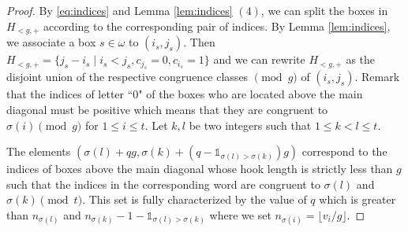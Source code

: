\documentclass[11pt,letterpaper]{amsart}
\numberwithin{equation}{section}
\numberwithin{df}{section}
\begin{document}
\begin{proof}
By \eqref{eq:indices} and Lemma \ref{lem:indices} $(4)$, we can split the boxes in $H_{<g,+}$ according to the corresponding pair of indices. By Lemma \ref{lem:indices}, we associate a box $s\in\omega$ to $(i_s,j_s)$. Then $H_{<g,+}=\lbrace j_s-i_s \mid i_s<j_s, c_{j_s}=0, c_{i_s}=1\rbrace$ and we can rewrite $H_{<g,+}$ as the disjoint union of the respective congruence classes $\pmod{g}$ of $(i_s,j_s)$. Remark that the indices of letter ``$0$" of the boxes who are located above the main diagonal must be positive which means that they are congruent to $\sigma(i)\pmod{g}$ for $1\leq i \leq t$.
Let $k,l$ be two integers such that $1\leq k <l \leq t$.

The elements $(\sigma(l)+qg,\sigma(k)+(q-\mathds{1}_{\sigma(l)>\sigma(k)})g)$ correspond to the indices of boxes above the main diagonal whose hook length is strictly less than $g$ such that the indices in the corresponding word are congruent to $\sigma(l)$ and $\sigma(k)\pmod{t}$. This set is fully characterized by the value of $q$ which is greater than $n_{\sigma(l)}$ and $n_{\sigma(k)}-1-\mathds{1}_{\sigma(l)>\sigma(k)}$ where we set $n_{\sigma(i)}=\lfloor v_i/g\rfloor$.



\end{proof}
\end{document}
